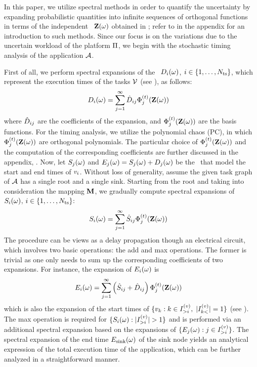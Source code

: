 In this paper, we utilize spectral methods in order to quantify the uncertainty by expanding probabilistic quantities into infinite sequences of orthogonal functions in terms of the independent \rvs\ $\mathbf{Z}(\omega)$ obtained in ; refer to  in the appendix for an introduction to such methods. Since our focus is on the variations due to the uncertain workload of the platform $\Pi$, we begin with the stochastic timing analysis of the application $\mathcal{A}$.

First of all, we perform spectral expansions of the \rvs\ $D_i(\omega)$, $i \in \{ 1, \dots, {N_\text{ts}} \}$, which represent the execution times of the tasks $\mathcal{V}$ (see ), as follows:
\[
  D_i(\omega) = \sum_{j = 1}^\infty \hat{D}_{ij} \Phi^{(t)}_j(\mathbf{Z}(\omega))
\]
where $\hat{D}_{ij}$ are the coefficients of the expansion, and $\Phi^{(t)}_j(\mathbf{Z}(\omega))$ are the basis functions. For the timing analysis, we utilize the polynomial chaos (PC), in which $\Phi^{(t)}_j(\mathbf{Z}(\omega))$ are orthogonal polynomials. The particular choice of $\Phi^{(t)}_j(\mathbf{Z}(\omega))$ and the computation of the corresponding coefficients are further discussed in the appendix, . Now, let $S_j(\omega)$ and $E_j(\omega) = S_j(\omega) + D_j(\omega)$ be the \rvs\ that model the start and end times of $v_i$. Without loss of generality, assume the given task graph of $\mathcal{A}$ has a single root and a single sink. Starting from the root and taking into consideration the mapping $\mathbf{M}$, we gradually compute spectral expansions of $S_i(\omega)$, $i \in \{ 1, \dots, {N_\text{ts}} \}$:
\[
  S_i(\omega) = \sum_{j = 1}^\infty \hat{S}_{ij} \Phi^{(t)}_j(\mathbf{Z}(\omega))
\]
The procedure can be views as a delay propagation though an electrical circuit, which involves two basic operations: the add and max operations. The former is trivial as one only needs to sum up the corresponding coefficients of two expansions. For instance, the expansion of $E_i(\omega)$ is
\[
  E_i(\omega) = \sum_{j = 1}^\infty \left( \hat{S}_{ij} + \hat{D}_{ij} \right) \Phi^{(t)}_j(\mathbf{Z}(\omega))
\]
which is also the expansion of the start times of $\{ v_k: k \in I^{(v)}_{>i}, \; |I^{(v)}_{k<}| = 1 \}$ (see ). The max operation is required for $\{ S_i(\omega): |I^{(v)}_{>i}| > 1 \}$ and is performed via an additional spectral expansion based on the expansions of $\{ E_j(\omega): j \in I^{(v)}_{>i} \}$. The spectral expansion of the end time $E_\text{sink}(\omega)$ of the sink node yields an analytical expression of the total execution time of the application, which can be further analyzed in a straightforward manner.

